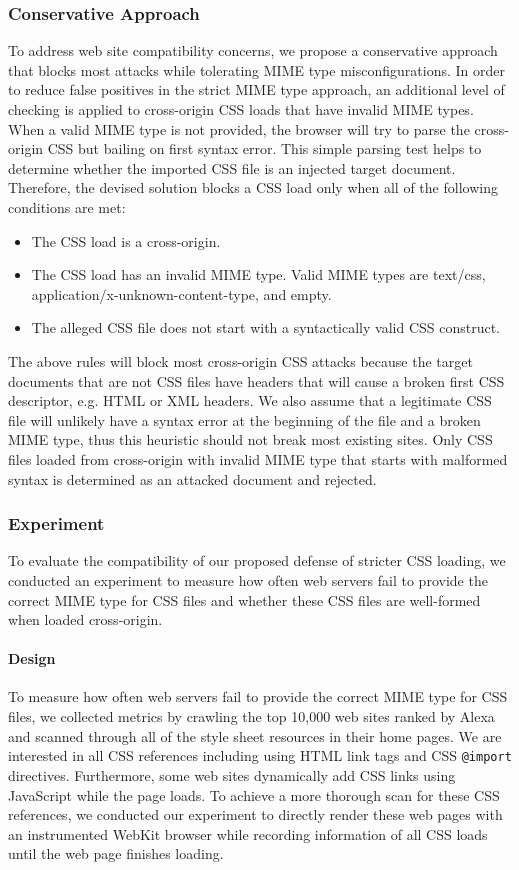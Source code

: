 \documentclass{acm_proc_article-sp}
\begin{document}
{\subsubsection{Conservative Approach}
To address web site compatibility concerns, we propose a conservative approach that blocks most attacks while tolerating MIME type misconfigurations. In order to reduce false positives in the strict MIME type approach, an additional level of checking is applied to cross-origin CSS loads that have invalid MIME types. When a valid MIME type is not provided, the browser will try to parse the cross-origin CSS but bailing on first syntax error. This simple parsing test helps to determine whether the imported CSS file is an injected target document. Therefore, the devised solution blocks a CSS load only when all of the following conditions are met:
\begin{itemize}
\item{The CSS load is a cross-origin.}
\item{The CSS load has an invalid MIME type. Valid MIME types are text/css, application/x-unknown-content-type, and empty.}
\item{The alleged CSS file does not start with a syntactically valid CSS construct.}
\end{itemize}
The above rules will block most cross-origin CSS attacks because the target documents that are not CSS files have headers that will cause a broken first CSS descriptor, e.g. HTML or XML headers. We also assume that a legitimate CSS file will unlikely have a syntax error at the beginning of the file and a broken MIME type, thus this heuristic should not break most existing sites. Only CSS files loaded from cross-origin with invalid MIME type that starts with malformed syntax is determined as an attacked document and rejected.

\subsubsection{Experiment}
To evaluate the compatibility of our proposed defense of stricter CSS loading, we conducted an experiment to measure how often web servers fail to provide the correct MIME type for CSS files and whether these CSS files are well-formed when loaded cross-origin.

\paragraph{Design}
To measure how often web servers fail to provide the correct MIME type for CSS files, we collected metrics by crawling the top 10,000 web sites ranked by Alexa\cite{alexa} and scanned through all of the style sheet resources in their home pages. We are interested in all CSS references including using HTML link tags and CSS \texttt{@import} directives. Furthermore, some web sites dynamically add CSS links using JavaScript while the page loads. To achieve a more thorough scan for these CSS references, we conducted our experiment to directly render these web pages with an instrumented WebKit browser while recording information of all CSS loads until the web page finishes loading.

}
\end{document}

